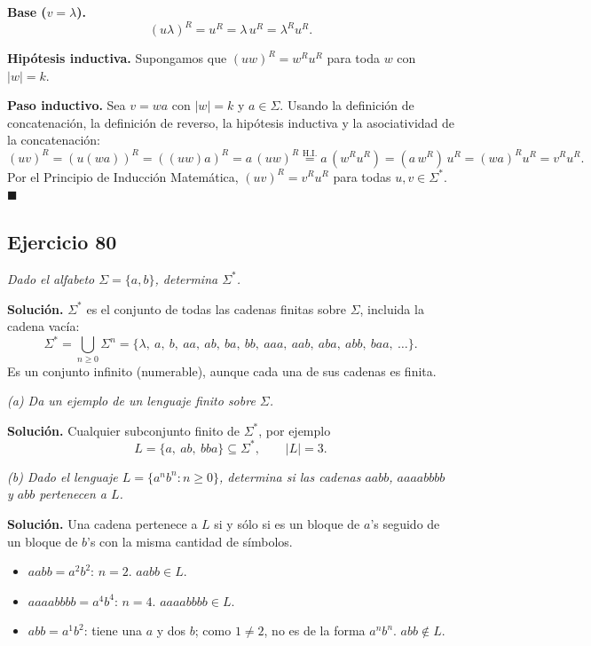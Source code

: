 \medskip
\noindent\textbf{Base ($v = \lambda$).}
\[
(u\lambda)^R = u^R = \lambda\, u^R = \lambda^R u^R .
\]

\noindent\textbf{Hipótesis inductiva.} Supongamos que $(uw)^R = w^R u^R$ para toda
$w$ con $|w| = k$.

\medskip
\noindent\textbf{Paso inductivo.} Sea $v = wa$ con $|w| = k$ y $a \in \Sigma$.
Usando la definición de concatenación, la definición de reverso, la hipótesis
inductiva y la asociatividad de la concatenación:
\[
(uv)^R = (u(wa))^R = ((uw)a)^R
= a\,(uw)^R
\overset{\text{H.I.}}{=} a\,(w^R u^R)
= (a\,w^R)\,u^R
= (wa)^R u^R
= v^R u^R .
\]
Por el Principio de Inducción Matemática, $(uv)^R = v^R u^R$ para todas
$u, v \in \Sigma^*$. $\blacksquare$

\subsection*{Ejercicio 80}

\noindent\textit{Dado el alfabeto $\Sigma = \{a, b\}$, determina $\Sigma^*$.}

\medskip
\noindent\textbf{Solución.} $\Sigma^*$ es el conjunto de todas las cadenas finitas
sobre $\Sigma$, incluida la cadena vacía:
\[
\Sigma^* = \bigcup_{n \geq 0} \Sigma^n
= \{\lambda,\ a,\ b,\ aa,\ ab,\ ba,\ bb,\ aaa,\ aab,\ aba,\ abb,\ baa,\ \dots\}.
\]
Es un conjunto infinito (numerable), aunque cada una de sus cadenas es finita.

\medskip
\noindent\textit{(a) Da un ejemplo de un lenguaje finito sobre $\Sigma$.}

\medskip
\noindent\textbf{Solución.} Cualquier subconjunto finito de $\Sigma^*$, por ejemplo
\[
L = \{a,\ ab,\ bba\} \subseteq \Sigma^*, \qquad |L| = 3 .
\]

\medskip
\noindent\textit{(b) Dado el lenguaje $L = \{a^n b^n : n \geq 0\}$, determina si las
    cadenas $aabb$, $aaaabbbb$ y $abb$ pertenecen a $L$.}

\medskip
\noindent\textbf{Solución.} Una cadena pertenece a $L$ si y sólo si es un bloque de
$a$'s seguido de un bloque de $b$'s con la misma cantidad de símbolos.
\begin{itemize}
    \item $aabb = a^2 b^2$: $n = 2$. \quad $aabb \in L$.
    \item $aaaabbbb = a^4 b^4$: $n = 4$. \quad $aaaabbbb \in L$.
    \item $abb = a^1 b^2$: tiene una $a$ y dos $b$; como $1 \neq 2$, no es de la
    forma $a^n b^n$. \quad $abb \notin L$.
\end{itemize}

